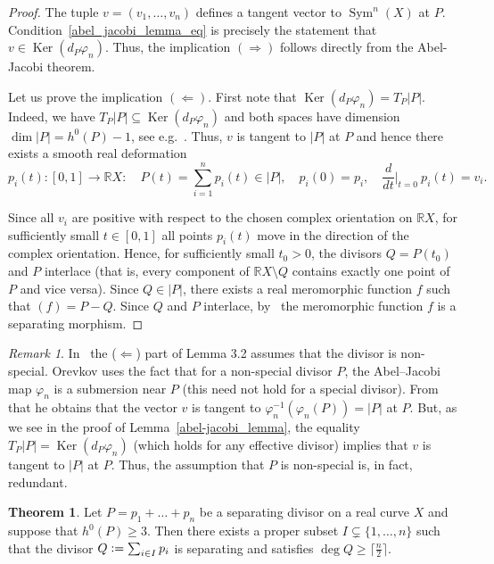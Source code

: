 \documentclass[x11names,oneside,11pt]{amsart}
\theoremstyle{definition}
\newtheorem{theorem}{Theorem}
\theoremstyle{remark}
\newtheorem{remark}{Remark}
\DeclareMathOperator{\Sym}{Sym}
\DeclareMathOperator{\Ker}{Ker}
\newcommand{\eqdef}{\vcentcolon=}
\newcommand{\R}{\mathbb{R}}
\begin{document}
  \begin{proof}
    The tuple $v = (v_1, \ldots, v_n)$  defines a tangent vector to $\Sym^n(X)$ at $P$.  Condition~\eqref{abel_jacobi_lemma_eq}  is precisely the statement that $v \in \Ker(d_{P}\varphi_n)$. Thus, the implication $(\Rightarrow)$ follows directly from the Abel-Jacobi theorem. 

    Let us prove the implication $(\Leftarrow)$. First note that $\Ker(d_P\varphi_n)=T_P|P|$. Indeed, we have $T_P|P| \subseteq \Ker(d_{P}\varphi_n)$ and both spaces have dimension $\dim|P|=h^0(P) -1$, see e.g.~\cite[p. 245]{griffiths_principles_2014}. Thus, $v$ is tangent to $|P|$ at $P$ and hence there exists a smooth real deformation
    \[
      p_i(t)\colon [0,1] \to \R X\colon \quad P(t) = \sum_{i=1}^n p_i(t) \in |P|, \quad  p_i(0) = p_i, \quad \frac{d}{dt}\bigg\vert_{t=0} \ p_i(t) = v_i.
    \]
    
    Since all $v_i$ are positive with respect to the chosen complex orientation on $\R X$, for sufficiently small $t \in [0,1]$ all points $p_i(t)$ move in the direction of the complex orientation. Hence, for sufficiently small $t_0>0$, the divisors $Q = P(t_0)$ and $P$ interlace (that is, every component of $\R X \setminus Q$ contains exactly one point of $P$ and vice versa). Since $Q \in |P|$, there exists a real meromorphic function $f$ such that $(f) = P - Q$. Since $Q$ and $P$ interlace, by~\cite[Lemma 2.10]{kummer_separating_2020} the meromorphic function $f$ is a separating morphism.
  \end{proof} 

  \begin{remark}
    In~\cite{orevkov_separating_2019} the ($\Leftarrow$) part of Lemma 3.2 assumes that the divisor is non-special. Orevkov uses the fact that for a non-special divisor $P$,  the Abel--Jacobi map $\varphi_n$ is a submersion near $P$ (this need not hold for a special divisor). From that he obtains that the vector $v$ is tangent to $\varphi_n^{-1}(\varphi_n(P)) = |P|$ at $P$. But, as we see in the proof of Lemma~\ref{abel-jacobi_lemma}, the equality $T_{P}|P| = \Ker(d_{P}\varphi_n)$ (which holds for any effective divisor) implies that $v$ is tangent to $|P|$ at $P$. Thus, the assumption that $P$ is non-special is, in fact, redundant.  
  \end{remark}

  \begin{theorem}\label{deleting_points}
      Let $P = p_1 + \ldots + p_n$ be a separating divisor on a real curve $X$ and suppose that $h^0(P) \geqslant 3$. Then there exists a proper subset  $I \subsetneq \{ 1, \ldots, n\}$ such that the divisor $Q \eqdef \sum_{i \in I} p_i$ is separating and satisfies $\deg{Q} \geqslant \lceil \frac{n}{2} \rceil$. 
  \end{theorem}  
\end{document}
